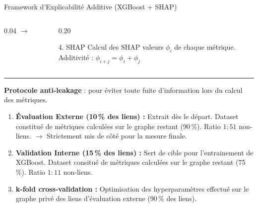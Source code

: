 \documentclass[10pt]{beamer}
\begin{document}
\begin{frame}{Framework d'Explicabilité Additive (XGBoost + SHAP)}
\begin{columns}[c]
        \begin{column}{0.04\textwidth}
            \centering $\rightarrow$
        \end{column}

        \begin{column}{0.20\textwidth}
            \begin{alertblock}{\centering \scriptsize 4. SHAP}
                \scriptsize \centering \vspace{0.05cm}
                Calcul des SHAP valeurs $\phi_i$ de chaque métrique. \\
                \tiny Additivité : $\phi_{i+j} = \phi_i + \phi_j$
            \vspace{0.05cm}
            \end{alertblock}
        \end{column}
    \end{columns}

    \vspace{0.3cm}
    \hrule
    \vspace{0.2cm}

    \textbf{Protocole anti-leakage} : pour éviter toute fuite d'information lors du calcul des métriques.
    \begin{enumerate}
        \item \textbf{Évaluation Externe (10\,\% des liens) :} Extrait dès le départ. Dataset constitué de métriques calculées sur le graphe restant (90\,\%). Ratio $1:51$ non-liens. $\rightarrow$ Strictement mis de côté pour la mesure finale.
        \item \textbf{Validation Interne (15\,\% des liens) :} Sert de cible pour l'entrainement de XGBoost. Dataset consitué de métriques calculées sur le graphe restant (75\,\%). Ratio $1:11$ non-liens.
        \item \textbf{k-fold cross-validation :} Optimisation des hyperparamètres effectué sur le graphe privé des liens d'évaluation externe (90\,\% des liens).
    \end{enumerate}

\end{frame}
\end{document}
